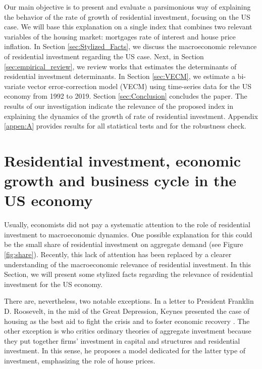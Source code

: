 \documentclass[12pt, a4paper]{article}
\begin{document}
Our main objective is to present and evaluate a parsimonious way of explaining the behavior of the rate of growth of residential investment, focusing on the US case.
We will base this explanation on a single index that combines two relevant variables of the housing market: mortgages rate of interest and house price inflation.
In Section \ref{sec:Stylized_Facts}, we discuss the macroeconomic relevance of residential investment regarding the US case.
Next, in Section \ref{sec:empirical_review}, we review works that estimates the determinants of residential investment determinants.
In Section \ref{sec:VECM}, we estimate a bi-variate vector error-correction model (VECM) using time-series data for the US economy from 1992 to 2019.
Section \ref{sec:Conclusion} concludes the paper.
The results of our investigation indicate the relevance of the proposed index in explaining the dynamics of the growth of rate of residential investment.
Appendix \ref{appen:A} provides results for all statistical tests and for the robustness check.



\section{Residential investment, economic growth and business cycle in the US economy}
\label{sec:orgfbbde46}
\label{sec:Stylized_Facts}
Usually, economists did not pay a systematic attention to the role of residential investment to macroeconomic dynamics.
One possible explanation for this could be the small share of residential investment on aggregate demand (see Figure \ref{fig:share}).
Recently, this lack of attention has been replaced by a clearer understanding of the macroeconomic relevance of residential investment.
In this Section, we will present some stylized facts regarding the relevance of residential investment for the US economy.

There are, nevertheless, two notable exceptions.
In a letter to President Franklin D. Roosevelt, in the mid of the Great Depression, Keynes presented the case of housing as the best aid to fight the crisis and to foster economic recovery \cite[p.~436]{keynes_collected_1978}.
The other exception is \textcite{duesenberry_investment_1958} who critics ordinary theories of aggregate investment because they put together firms’ investment in capital and structures and residential investment.
In this sense, he proposes a model dedicated for the latter type of investment, emphasizing the role of house prices.
\end{document}
